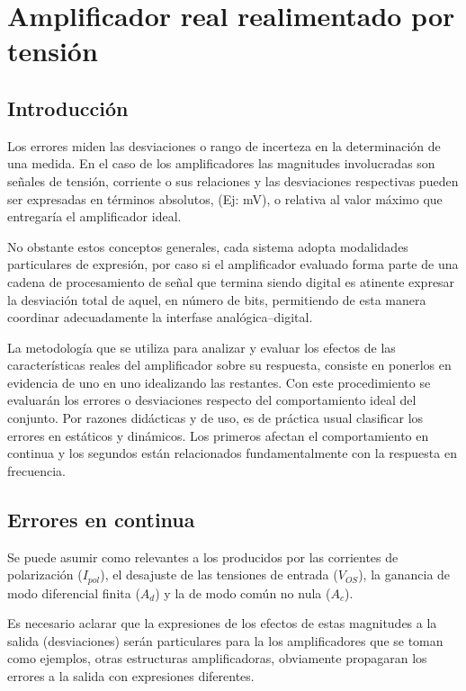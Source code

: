 \newpage
\section{Amplificador real realimentado por tensión}
\subsection*{Introducción}
Los errores miden las desviaciones o rango de incerteza en la determinación de una medida. En el caso de los amplificadores las magnitudes involucradas son señales de tensión, corriente o sus relaciones y las desviaciones respectivas pueden ser expresadas en términos absolutos, (Ej: mV), o relativa al valor máximo que entregaría el amplificador ideal.

No obstante estos conceptos generales, cada sistema adopta modalidades particulares de expresión, por caso si el amplificador evaluado forma parte de una cadena de procesamiento de señal que termina siendo digital es atinente expresar la desviación total de aquel, en número de bits, permitiendo de esta manera coordinar adecuadamente la interfase analógica--digital.

La metodología que se utiliza para analizar y evaluar los efectos de las características reales del amplificador sobre su respuesta, consiste en ponerlos en evidencia de uno en uno idealizando las restantes. Con este procedimiento se evaluarán los errores o desviaciones respecto del comportamiento ideal del conjunto. Por razones didácticas y de uso, es de práctica usual clasificar los errores en estáticos y dinámicos. Los primeros afectan el comportamiento en continua y los segundos están relacionados fundamentalmente con la respuesta en frecuencia.
\subsection{Errores en continua}

Se puede asumir como relevantes a los producidos por las corrientes de polarización ($I_{pol}$), el desajuste de las tensiones de entrada ($V_{OS}$), la ganancia de modo diferencial finita ($A_d$) y la de modo común no nula ($A_c$).

Es necesario aclarar que la expresiones de los efectos de estas magnitudes a la salida (desviaciones) serán particulares para la los amplificadores que se toman como ejemplos, otras estructuras amplificadoras, obviamente propagaran los errores a la salida con expresiones diferentes.

